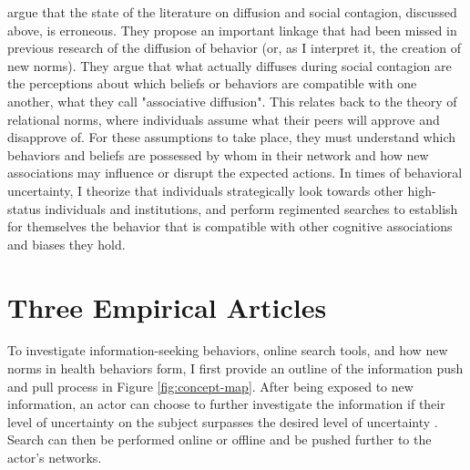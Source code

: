 \citet{goldbergSocialContagionAssociative2018} argue that the state of the
literature on diffusion and social contagion, discussed above, is erroneous.
They propose an important linkage that had been missed in previous research of
the diffusion of behavior (or, as I interpret it, the creation of new norms).
They argue that what actually diffuses during social contagion are the
perceptions about which beliefs or behaviors are compatible with one another,
what they call "associative diffusion". This relates back to the theory of
relational norms, where individuals assume what their peers will approve and
disapprove of. For these assumptions to take place, they must understand which
behaviors and beliefs are possessed by whom in their network and how new
associations may influence or disrupt the expected actions. In times of
behavioral uncertainty, I theorize that individuals strategically look towards
other high-status individuals and institutions, and perform regimented searches
to establish for themselves the behavior that is compatible with other cognitive
associations and biases they hold.

\section{Three Empirical Articles}

To investigate information-seeking behaviors, online search tools, and how new
norms in health behaviors form, I first provide an outline of the information
push and pull process in Figure \ref{fig:concept-map}. After being exposed to
new information, an actor can choose to further investigate the information if
their level of uncertainty on the subject surpasses the desired level of
uncertainty \citep{brashersCommunicationUncertaintyManagement2001}. Search can
then be performed online or offline and be pushed further to the actor's
networks.


